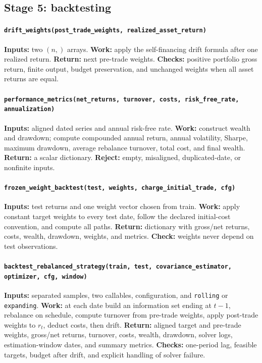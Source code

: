\documentclass[10pt]{article}
\begin{document}
\begin{sloppypar}
\subsection*{Stage 5: backtesting}

\paragraph{\texttt{drift\_weights(post\_trade\_weights,
realized\_asset\_return)}}
\textbf{Inputs:} two $(n,)$ arrays. \textbf{Work:} apply the self-financing
drift formula after one realized return. \textbf{Return:} next pre-trade
weights. \textbf{Checks:} positive portfolio gross return, finite output,
budget preservation, and unchanged weights when all asset returns are equal.

\paragraph{\texttt{performance\_metrics(net\_returns, turnover, costs,
risk\_free\_rate, annualization)}}
\textbf{Inputs:} aligned dated series and annual risk-free rate.
\textbf{Work:} construct wealth and drawdown; compute compounded annual return,
annual volatility, Sharpe, maximum drawdown, average rebalance turnover, total
cost, and final wealth. \textbf{Return:} a scalar dictionary.
\textbf{Reject:} empty, misaligned, duplicated-date, or nonfinite inputs.

\paragraph{\texttt{frozen\_weight\_backtest(test, weights,
charge\_initial\_trade, cfg)}}
\textbf{Inputs:} test returns and one weight vector chosen from train.
\textbf{Work:} apply constant target weights to every test date, follow the
declared initial-cost convention, and compute all paths.
\textbf{Return:} dictionary with gross/net returns, costs, wealth, drawdown,
weights, and metrics. \textbf{Check:} weights never depend on test observations.

\paragraph{\texttt{backtest\_rebalanced\_strategy(train, test,
covariance\_estimator, optimizer, cfg, window)}}
\textbf{Inputs:} separated samples, two callables, configuration, and
\texttt{rolling} or \texttt{expanding}. \textbf{Work:} at each date build an
information set ending at $t-1$, rebalance on schedule, compute turnover from
pre-trade weights, apply post-trade weights to $r_t$, deduct costs, then drift.
\textbf{Return:} aligned target and pre-trade weights, gross/net returns,
turnover, costs, wealth, drawdown, solver logs, estimation-window dates, and
summary metrics. \textbf{Checks:} one-period lag, feasible targets, budget after
drift, and explicit handling of solver failure.


\end{sloppypar}
\end{document}
